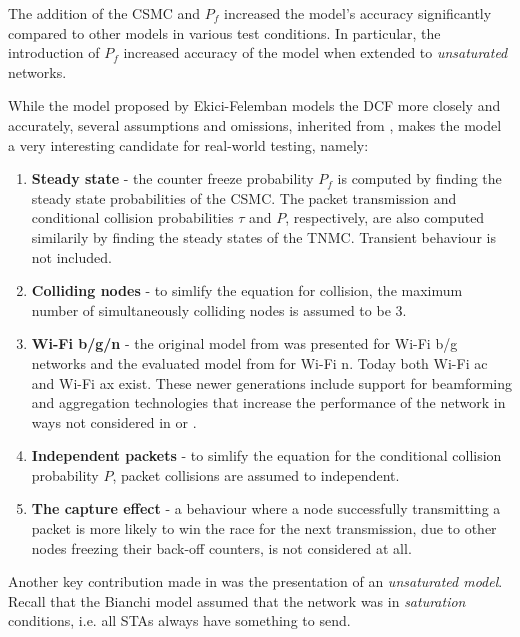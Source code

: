 The addition of the CSMC and $P_f$ increased the model's accuracy significantly
compared to other models in various test conditions. In particular, the
introduction of $P_f$ increased accuracy of the model when extended to
\emph{unsaturated} networks.

While the model proposed by Ekici-Felemban models the DCF more closely and
accurately, several assumptions and omissions, inherited from \cite{bianchi},
makes the model a very interesting candidate for real-world testing, namely:

\begin{enumerate}

	\item \textbf{Steady state} - the counter freeze probability $P_f$ is
	computed by finding the steady state probabilities of the CSMC. The packet
	transmission and conditional collision probabilities $\tau$ and $P$,
	respectively, are also computed similarily by finding the steady states of
	the TNMC. Transient behaviour is not included.

	\item \textbf{Colliding nodes} - to simlify the equation for collision,
	the maximum number of simultaneously colliding nodes is assumed to be 3.

	\item \textbf{Wi-Fi b/g/n} - the original model from \cite{bianchi} was
	presented for Wi-Fi b/g networks and the evaluated model from \cite{felemban}
	for Wi-Fi n. Today both Wi-Fi ac and Wi-Fi ax exist. These newer generations
	include support for beamforming and aggregation technologies that increase
	the performance of the network in ways not considered in \cite{bianchi} or
	\cite{felemban}.

	\item \textbf{Independent packets} - to simlify the equation for the
	conditional collision probability $P$, packet collisions are assumed to
	independent.

	\item \textbf{The capture effect} - a behaviour where a node successfully
	transmitting a packet is more likely to win the race for the next transmission,
	due to other nodes freezing their back-off counters, is not considered at all.

\end{enumerate}

Another key contribution made in \cite{felemban} was the presentation of an
\emph{unsaturated model}. Recall that the Bianchi model assumed that the
network was in \emph{saturation} conditions, i.e. all STAs always have
something to send.

